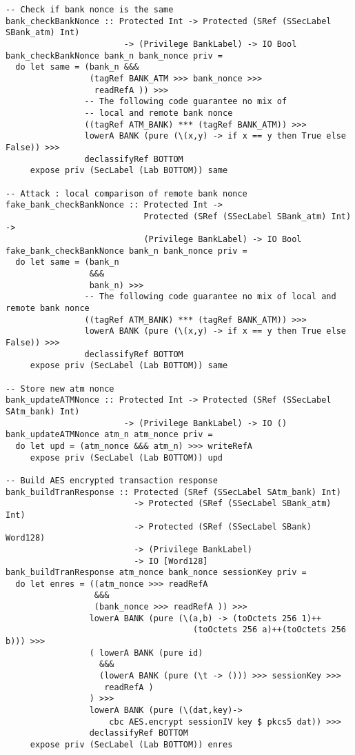 \begin{Verbatim}[fontsize=\footnotesize,frame=lines,
                 framesep=5mm, label={[BankSystem.hs]BankSystem.hs}]
-- Check if bank nonce is the same
bank_checkBankNonce :: Protected Int -> Protected (SRef (SSecLabel SBank_atm) Int) 
                        -> (Privilege BankLabel) -> IO Bool
bank_checkBankNonce bank_n bank_nonce priv =
  do let same = (bank_n &&& 
                 (tagRef BANK_ATM >>> bank_nonce >>> 
                  readRefA )) >>>
                -- The following code guarantee no mix of 
                -- local and remote bank nonce 
                ((tagRef ATM_BANK) *** (tagRef BANK_ATM)) >>>
                lowerA BANK (pure (\(x,y) -> if x == y then True else False)) >>>
                declassifyRef BOTTOM
     expose priv (SecLabel (Lab BOTTOM)) same 

-- Attack : local comparison of remote bank nonce     
fake_bank_checkBankNonce :: Protected Int -> 
                            Protected (SRef (SSecLabel SBank_atm) Int) ->
                            (Privilege BankLabel) -> IO Bool
fake_bank_checkBankNonce bank_n bank_nonce priv =
  do let same = (bank_n 
                 &&& 
                 bank_n) >>>
                -- The following code guarantee no mix of local and remote bank nonce 
                ((tagRef ATM_BANK) *** (tagRef BANK_ATM)) >>>
                lowerA BANK (pure (\(x,y) -> if x == y then True else False)) >>>
                declassifyRef BOTTOM
     expose priv (SecLabel (Lab BOTTOM)) same 

-- Store new atm nonce
bank_updateATMNonce :: Protected Int -> Protected (SRef (SSecLabel SAtm_bank) Int) 
                        -> (Privilege BankLabel) -> IO ()
bank_updateATMNonce atm_n atm_nonce priv =
  do let upd = (atm_nonce &&& atm_n) >>> writeRefA
     expose priv (SecLabel (Lab BOTTOM)) upd 

-- Build AES encrypted transaction response
bank_buildTranResponse :: Protected (SRef (SSecLabel SAtm_bank) Int) 
                          -> Protected (SRef (SSecLabel SBank_atm) Int)
                          -> Protected (SRef (SSecLabel SBank) Word128) 
                          -> (Privilege BankLabel)
                          -> IO [Word128]
bank_buildTranResponse atm_nonce bank_nonce sessionKey priv =
  do let enres = ((atm_nonce >>> readRefA  
                  &&& 
                  (bank_nonce >>> readRefA )) >>>
                 lowerA BANK (pure (\(a,b) -> (toOctets 256 1)++
                                      (toOctets 256 a)++(toOctets 256 b))) >>>
                 ( lowerA BANK (pure id)
                   &&&
                   (lowerA BANK (pure (\t -> ())) >>> sessionKey >>> 
                    readRefA )
                 ) >>>
                 lowerA BANK (pure (\(dat,key)-> 
                     cbc AES.encrypt sessionIV key $ pkcs5 dat)) >>>
                 declassifyRef BOTTOM
     expose priv (SecLabel (Lab BOTTOM)) enres


\end{Verbatim}
